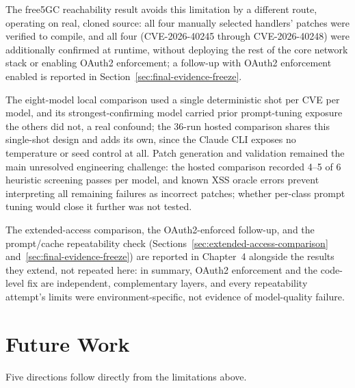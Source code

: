 \documentclass[12pt,a4paper]{report}
\begin{document}
The free5GC reachability result avoids this limitation by a different route, operating on real, cloned source: all four manually selected handlers' patches were verified to compile, and all four (CVE-2026-40245 through CVE-2026-40248) were additionally confirmed at runtime, without deploying the rest of the core network stack or enabling OAuth2 enforcement; a follow-up with OAuth2 enforcement enabled is reported in Section~\ref{sec:final-evidence-freeze}.

The eight-model local comparison used a single deterministic shot per CVE per model, and its strongest-confirming model carried prior prompt-tuning exposure the others did not, a real confound; the 36-run hosted comparison shares this single-shot design and adds its own, since the Claude CLI exposes no temperature or seed control at all. Patch generation and validation remained the main unresolved engineering challenge: the hosted comparison recorded 4--5 of 6 heuristic screening passes per model, and known XSS oracle errors prevent interpreting all remaining failures as incorrect patches; whether per-class prompt tuning would close it further was not tested.

The extended-access comparison, the OAuth2-enforced follow-up, and the prompt/cache repeatability check (Sections~\ref{sec:extended-access-comparison} and~\ref{sec:final-evidence-freeze}) are reported in Chapter~4 alongside the results they extend, not repeated here: in summary, OAuth2 enforcement and the code-level fix are independent, complementary layers, and every repeatability attempt's limits were environment-specific, not evidence of model-quality failure.

\section{Future Work}
\label{sec:future-work}

Five directions follow directly from the limitations above.
\end{document}
